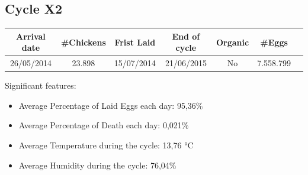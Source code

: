 \documentclass[11pt]{article}
\begin{document}
\subsection{Cycle X2}
\begin{center}
    \begin{tabular}{| c | c | c | c | c | c | c |} 
        \hline
        Arrival date & \#Chickens & Frist Laid & End of cycle & Organic & \#Eggs\\ [0.5ex] 
        \hline
        26/05/2014 & 23.898 & 15/07/2014 & 21/06/2015 & No & 7.558.799\\ 
        \hline
    \end{tabular}
\end{center}

Significant features:
\begin{itemize}
    \item Average Percentage of Laid Eggs each day: 95,36\%
    \item Average Percentage of Death each day: 0,021\%
    \item Average Temperature during the cycle: 13,76 °C
    \item Average Humidity during the cycle: 76,04\%
\end{itemize}
\end{document}
